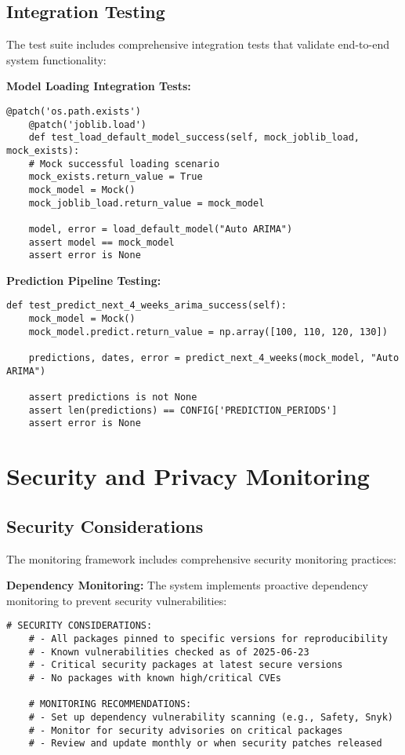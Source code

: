 \subsection{Integration Testing}

The test suite includes comprehensive integration tests that validate end-to-end system functionality:

\textbf{Model Loading Integration Tests:}
\begin{lstlisting}[language=MyPython, caption={Model Loading Integration Test}]
	@patch('os.path.exists')
	@patch('joblib.load')
	def test_load_default_model_success(self, mock_joblib_load, mock_exists):
	# Mock successful loading scenario
	mock_exists.return_value = True
	mock_model = Mock()
	mock_joblib_load.return_value = mock_model
	
	model, error = load_default_model("Auto ARIMA")
	assert model == mock_model
	assert error is None
\end{lstlisting}

\textbf{Prediction Pipeline Testing:}
\begin{lstlisting}[language=MyPython, caption={Prediction Pipeline Integration Test}]
	def test_predict_next_4_weeks_arima_success(self):
	mock_model = Mock()
	mock_model.predict.return_value = np.array([100, 110, 120, 130])
	
	predictions, dates, error = predict_next_4_weeks(mock_model, "Auto ARIMA")
	
	assert predictions is not None
	assert len(predictions) == CONFIG['PREDICTION_PERIODS']
	assert error is None
\end{lstlisting}

\section{Security and Privacy Monitoring}

\subsection{Security Considerations}

The monitoring framework includes comprehensive security monitoring practices:

\textbf{Dependency Monitoring:}
The system implements proactive dependency monitoring to prevent security vulnerabilities:

\begin{lstlisting}[language=MyPython, caption={Security Dependency Configuration}]
	# SECURITY CONSIDERATIONS:
	# - All packages pinned to specific versions for reproducibility
	# - Known vulnerabilities checked as of 2025-06-23
	# - Critical security packages at latest secure versions
	# - No packages with known high/critical CVEs
	
	# MONITORING RECOMMENDATIONS:
	# - Set up dependency vulnerability scanning (e.g., Safety, Snyk)
	# - Monitor for security advisories on critical packages
	# - Review and update monthly or when security patches released
\end{lstlisting}

